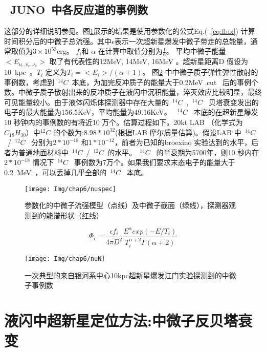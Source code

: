 \subsection{~JUNO~中各反应道的事例数}
这部分的详细说明参见\citep{an2015neutrino}。图\ref{fig:nuspec}展示的结果是使用参数化的公式Eq.(~\ref{eq:flux}) 计算时间积分后的中微子总流强。其中$\epsilon$表示一次超新星爆发中微子带走的总能量，通常取值为$3\times10^{53}$erg。 $f_i$和 $\alpha$ 在计算中取值分别为$\frac{1}{6}$。 平均中微子能量$<E_{\nu_e,\bar{\nu_e},\nu_x}>$ 取了有代表性的12MeV, 14MeV, 16MeV 。超新星距离D 假设为10~kpc~。$T_i$ 定义为$T_i = <E_i> /(\alpha+1)$。  图\ref{fig:pnuN} 中中微子质子弹性弹性散射的事例数，考虑到~$^{14}C$~本底，为加完反冲质子的能量大于0.2MeV~cut~ 后的事例个数。中微子质子散射出来的反冲质子在液闪中沉积能量，淬灭效应比较明显，最终可见能量较小。由于液体闪烁体探测器中存在大量的~$^{14}C$~,~$^{14}C$~ 贝塔衰变发出的电子的最大能量为156.5KeV，平均能量为49.16KeV。 ~$^{14}C$~ 本底的在超新星爆发10 秒钟内的事例数的有将近10 万个。估算过程如下。20kt LAB （化学式为$C_{18}H_{30}$）中$^{12}C$ 的个数为:$8.98*10^{32}$(根据LAB 摩尔质量估算)。假设LAB 中~$^{14}C$~/~$^{12}C$~ 分别为$2*10^{-18}$ 和$1*10^{-12}$，前者为已知的broexino 实验达到的水平，后者为普通地面材料中~$^{14}C$~/~$^{12}C$~的水平。~$^{14}C$~ 的半衰期为5700年，则10 秒内在$2*10^{-18}$ 情况下~$^{14}C$~ 事例数为7万个。如果我们要求末态电子的能量大于0.2~MeV~，可以丢掉几乎全部的~$^{14}C$~ 本底。
\begin{figure}[!htbp]
  \centering
   \texttt{[image: Img/chap6/nuspec]}
    \caption{参数化的中微子流强模型（点线）及中微子截面（绿线），探测器观测到的能谱形状（红线）}
  \label{fig:nuspec}
\end{figure}


\begin{equation}\label{eq:flux}
\Phi_i=\frac{\epsilon f_i}{4\pi D^2}\frac{E^{\alpha} exp(-E/T_i)}{T^{\alpha+2}_{i}\Gamma(\alpha+2)}
\end{equation}

\begin{figure}[!htbp]
  \centering
   \texttt{[image: Img/chap6/nuN]}
    \caption{一次典型的来自银河系中心10kpc超新星爆发江门实验探测到的中微子事例数}
  \label{fig:pnuN}
\end{figure}

\section{液闪中超新星定位方法:中微子反贝塔衰变}
